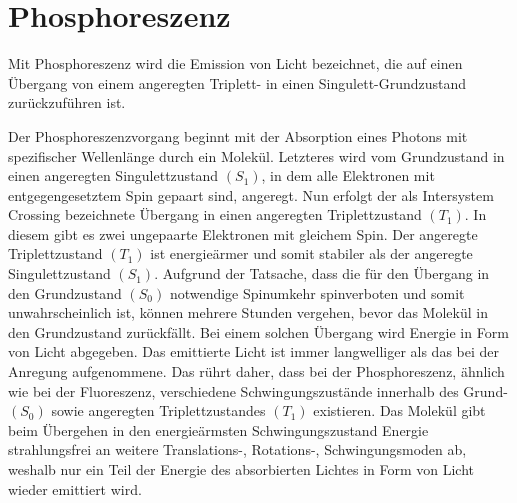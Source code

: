 \section{Phosphoreszenz}

Mit Phosphoreszenz wird die Emission von Licht bezeichnet, die auf einen Übergang von einem angeregten Triplett- in einen Singulett-Grundzustand zurückzuführen ist. 

Der Phosphoreszenzvorgang beginnt mit der Absorption eines Photons mit spezifischer Wellenlänge durch ein Molekül. Letzteres wird vom Grundzustand in einen angeregten Singulettzustand $(S_1)$, in dem alle Elektronen mit entgegengesetztem Spin gepaart sind, angeregt. Nun erfolgt der als Intersystem Crossing bezeichnete Übergang in einen angeregten Triplettzustand $(T_1)$. In diesem gibt es zwei ungepaarte Elektronen mit gleichem Spin. Der angeregte Triplettzustand $(T_1)$ ist energieärmer und somit stabiler als der angeregte Singulettzustand $(S_1)$. Aufgrund der Tatsache, dass die für den Übergang in den Grundzustand $(S_0)$ notwendige Spinumkehr spinverboten und somit unwahrscheinlich ist, können mehrere Stunden vergehen, bevor das Molekül in den Grundzustand zurückfällt. Bei einem solchen Übergang wird Energie in Form von Licht abgegeben. Das emittierte Licht ist immer langwelliger als das bei der Anregung aufgenommene. Das rührt daher, dass bei der Phosphoreszenz, ähnlich wie bei der Fluoreszenz, verschiedene Schwingungszustände innerhalb des Grund- $(S_0)$ sowie angeregten Triplettzustandes $(T_1)$ existieren. Das Molekül gibt beim Übergehen in den energieärmsten Schwingungszustand Energie strahlungsfrei an weitere Translations-, Rotations-, Schwingungsmoden ab, weshalb nur ein Teil der Energie des absorbierten Lichtes in Form von Licht wieder emittiert wird. 
\cite{Phosphoreszenz1, Phosphoreszenz2, Phosphoreszenz3}
